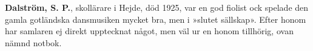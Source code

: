 \textbf{Dalström, S. P.}, skollärare i Hejde, död 1925, var en god fiolist ock spelade den gamla gotländska dansmusiken mycket bra, men i »slutet sällskap». Efter honom har samlaren ej direkt upptecknat något, men väl ur en honom tillhörig, ovan nämnd notbok. 
